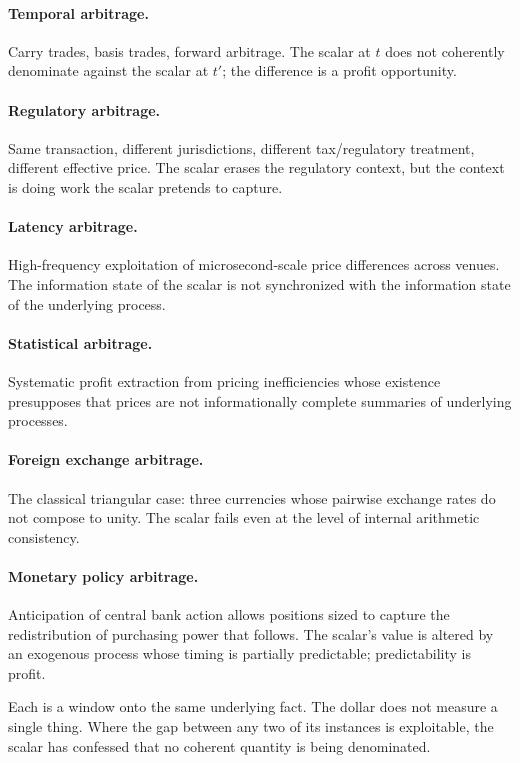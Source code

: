 \documentclass[11pt]{article}
\begin{document}
\paragraph{Temporal arbitrage.} Carry trades, basis trades, forward arbitrage. The scalar at $t$ does not coherently denominate against the scalar at $t'$; the difference is a profit opportunity.

\paragraph{Regulatory arbitrage.} Same transaction, different jurisdictions, different tax/regulatory treatment, different effective price. The scalar erases the regulatory context, but the context is doing work the scalar pretends to capture.

\paragraph{Latency arbitrage.} High-frequency exploitation of microsecond-scale price differences across venues. The information state of the scalar is not synchronized with the information state of the underlying process.

\paragraph{Statistical arbitrage.} Systematic profit extraction from pricing inefficiencies whose existence presupposes that prices are not informationally complete summaries of underlying processes.

\paragraph{Foreign exchange arbitrage.} The classical triangular case: three currencies whose pairwise exchange rates do not compose to unity. The scalar fails even at the level of internal arithmetic consistency.

\paragraph{Monetary policy arbitrage.} Anticipation of central bank action allows positions sized to capture the redistribution of purchasing power that follows. The scalar's value is altered by an exogenous process whose timing is partially predictable; predictability is profit.

Each is a window onto the same underlying fact. The dollar does not measure a single thing. Where the gap between any two of its instances is exploitable, the scalar has confessed that no coherent quantity is being denominated.
\end{document}

